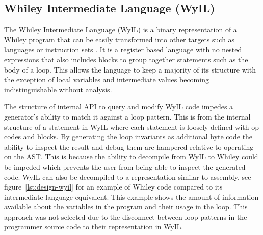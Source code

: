 \subsection{Whiley Intermediate Language (WyIL)}

The Whiley Intermediate Language (WyIL) is a binary representation of a Whiley program
that can be easily transformed into other targets such as languages or
instruction sets \cite{wyil}.
It is a register based language with no nested expressions
that also includes blocks to group together statements such as the body of a loop.
This allows the language to keep a majority of its structure with the
exception of local variables and intermediate values becoming indistinguishable
without analysis.

The structure of internal API to query and modify WyIL code impedes a
generator's ability to match it against a loop pattern.
This is from the internal structure of a statement in WyIL where each
statement is loosely defined with op codes and blocks.
By generating the loop invariants as additional byte code the ability to
inspect the result and debug them are hampered relative to operating on the
AST.  This is because the ability to decompile from WyIL to Whiley could
be impeded which prevents the user from being able to inspect the generated
code.
WyIL can also be decompiled to a representation similar to assembly, see
figure~\ref{lst:design-wyil} for an example of Whiley code compared to its
intermediate language equivalent.
This example shows the amount of information available about the variables
in the program and their usage in the loop.
This approach was not selected due to the disconnect between loop patterns
in the programmer source code to their representation in WyIL.


